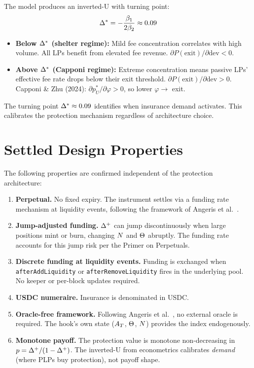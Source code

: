 The model produces an inverted-U with turning point:
\begin{equation}\label{eq:turning-point}
  \Delta^{*} = -\frac{\beta_1}{2\beta_2} \approx 0.09
\end{equation}

\begin{itemize}
  \item \textbf{Below $\Delta^{*}$ (shelter regime):} Mild fee concentration correlates with
    high volume. All LPs benefit from elevated fee revenue. $\partial P(\text{exit})/\partial \text{dev} < 0$.
  \item \textbf{Above $\Delta^{*}$ (Capponi regime):} Extreme concentration means passive LPs'
    effective fee rate drops below their exit threshold.
    $\partial P(\text{exit})/\partial \text{dev} > 0$.
    Capponi \& Zhu (2024): $\partial p^*_U/\partial \varphi > 0$, so lower $\varphi \to$ exit.
\end{itemize}

The turning point $\Delta^{*} \approx 0.09$ identifies when insurance demand activates.
This calibrates the protection mechanism regardless of architecture choice.

\section{Settled Design Properties}\label{sec:design-properties}

The following properties are confirmed independent of the protection architecture:

\begin{enumerate}
  \item \textbf{Perpetual.} No fixed expiry. The instrument settles via a funding rate mechanism
    at liquidity events, following the framework of Angeris et al.\ \cite{angeris2022perpetuals}.

  \item \textbf{Jump-adjusted funding.} $\Delta^{+}$ can jump discontinuously when large positions
    mint or burn, changing $N$ and $\Theta$ abruptly. The funding rate accounts for
    this jump risk per the Primer on Perpetuals.

  \item \textbf{Discrete funding at liquidity events.} Funding is exchanged when
    \texttt{afterAddLiquidity} or \texttt{afterRemoveLiquidity} fires in the underlying pool.
    No keeper or per-block updates required.

  \item \textbf{USDC numeraire.} Insurance is denominated in USDC.

  \item \textbf{Oracle-free framework.} Following Angeris et al.\ \cite{angeris2022replicating},
    no external oracle is required. The hook's own state ($A_T$, $\Theta$, $N$)
    provides the index endogenously.

  \item \textbf{Monotone payoff.} The protection value is monotone non-decreasing in
    $p = \Delta^{+}/(1-\Delta^{+})$. The inverted-U from econometrics calibrates
    \emph{demand} (where PLPs buy protection), not payoff shape.
\end{enumerate}

